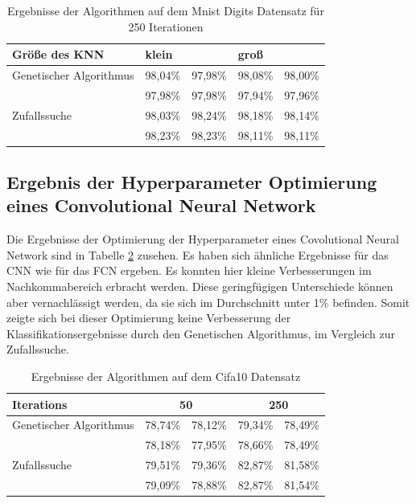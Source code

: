 \begin{table}
\centering
\caption{Ergebnisse der Algorithmen auf dem Mnist Digits Datensatz für 250 Iterationen}
\label{tab:fully_250}
\begin{tabular}{lllll} 
\toprule
Größe des KNN & \multicolumn{2}{l}{klein} & \multicolumn{2}{l}{groß}  \\ 
\midrule
Genetischer Algorithmus             & 98,04\% & 97,98\%         & 98,08\% & 98,00\%         \\
              & 97,98\% & 97,98\%         & 97,94\% & 97,96\%         \\
Zufallssuche            & 98,03\% & 98,24\%         & 98,18\% & 98,14\%         \\
              & 98,23\% & 98,23\%         & 98,11\% & 98,11\%         \\
\bottomrule
\end{tabular}
\end{table}




\subsection{Ergebnis der Hyperparameter Optimierung eines Convolutional Neural Network}
Die Ergebnisse der Optimierung der Hyperparameter eines Covolutional Neural Network sind in Tabelle \ref{tab:cnn} zusehen. Es haben sich ähnliche Ergebnisse für das CNN wie für das FCN ergeben. Es konnten hier kleine Verbesserungen im Nachkommabereich erbracht werden. Diese geringfügigen Unterschiede können aber vernachlässigt werden, da sie sich im Durchschnitt unter 1\% befinden. Somit zeigte sich bei dieser Optimierung keine Verbesserung der Klassifikationsergebnisse durch den Genetischen Algorithmus, im Vergleich zur Zufallssuche.

\begin{table}[h]
\centering
\caption{Ergebnisse der Algorithmen auf dem Cifa10 Datensatz}
\label{tab:cnn}
\begin{tabular}{lllll} 
\toprule
Iterations & \multicolumn{2}{c}{50} & \multicolumn{2}{c}{250}  \\ 
\midrule
Genetischer Algorithmus         & 78,74\% & 78,12\%      & 79,34\% & 78,49\%                \\
           & 78,18\% & 77,95\%      & 78,66\% & 78,49\%                \\
Zufallssuche         & 79,51\% & 79,36\%      & 82,87\% & 81,58\%                \\
           & 79,09\% & 78,88\%      & 82,87\% & 81,54\%                \\
\bottomrule
\end{tabular}
\end{table}

